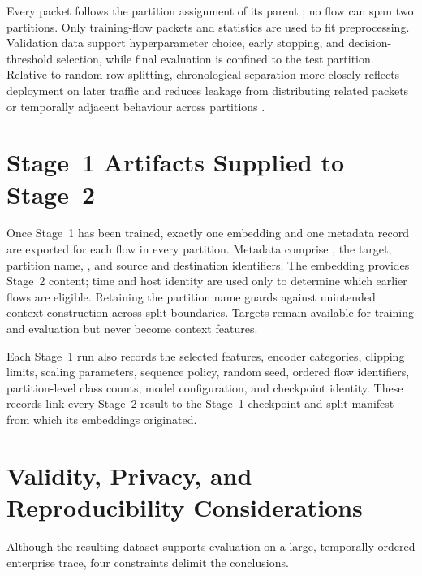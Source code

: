 \documentclass[11pt,fleqn]{report}
\begin{document}
Every packet follows the partition assignment of its parent ; no flow can span two partitions. Only training-flow packets and statistics are used to fit preprocessing. Validation data support hyperparameter choice, early stopping, and decision-threshold selection, while final evaluation is confined to the test partition. Relative to random row splitting, chronological separation more closely reflects deployment on later traffic and reduces leakage from distributing related packets or temporally adjacent behaviour across partitions \cite{SommerPaxson2010,Arp2022DosDonts}.

\section{Stage~1 Artifacts Supplied to Stage~2}
\label{subsec:stage2_artifacts}

Once Stage~1 has been trained, exactly one embedding and one metadata record are exported for each flow in every partition. Metadata comprise , the target, partition name, , and source and destination identifiers. The embedding provides Stage~2 content; time and host identity are used only to determine which earlier flows are eligible. Retaining the partition name guards against unintended context construction across split boundaries. Targets remain available for training and evaluation but never become context features.

Each Stage~1 run also records the selected features, encoder categories, clipping limits, scaling parameters, sequence policy, random seed, ordered flow identifiers, partition-level class counts, model configuration, and checkpoint identity. These records link every Stage~2 result to the Stage~1 checkpoint and split manifest from which its embeddings originated.

\section{Validity, Privacy, and Reproducibility Considerations}
\label{subsec:dataset_limitations}

Although the resulting dataset supports evaluation on a large, temporally ordered enterprise trace, four constraints delimit the conclusions.
\end{document}
